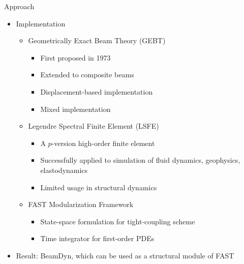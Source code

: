 \documentclass[dvips,xcolor=cmyk]{beamer}
\begin{document}
\begin{frame}{Approach}
  \begin{itemize}
    \item
    Implementation
    \begin{itemize}
      \item
      Geometrically Exact Beam Theory (GEBT) 
      \begin{itemize}
        \item
        \pause
        First proposed in 1973 \citep{Ressiner1973}
        \item
        \pause
        Extended to composite beams \citep{HodgesBeamBook}
        \item
        \pause
        Displacement-based implementation \citep{Dymore:2013}
        \item
        \pause
        Mixed implementation \citep{YuGEBT}
      \end{itemize}
      \item
      Legendre Spectral Finite Element (LSFE) \citep{Patera:1984}
      \begin{itemize}
          \item
          \pause
          A $p$-version high-order finite element 
          \item
          \pause
          Successfully applied to simulation of fluid dynamics, geophysics, elastodynamics
          \item
          \pause
          Limited usage in structural dynamics
      \end{itemize}
      \item
      FAST Modularization Framework \citep{Jonkman:2013}
      \begin{itemize}
          \item State-space formulation for tight-coupling scheme
          \item Time integrator for first-order PDEs
      \end{itemize}
    \end{itemize}
    \item
    Result: BeamDyn, which can be used as a structural module of FAST
  \end{itemize}
\end{frame}
\end{document}
